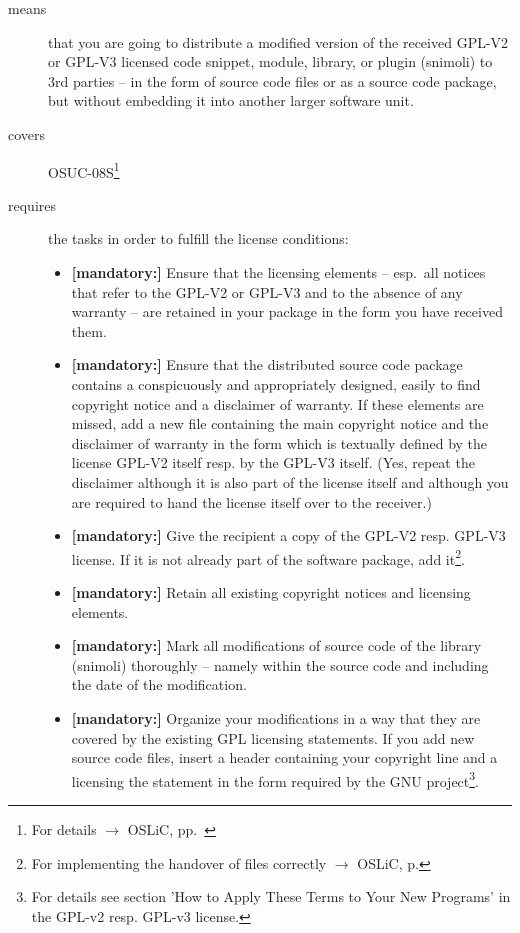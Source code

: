 \begin{description}
\item[means] that you are going to distribute a modified version of the received
GPL-V2 or GPL-V3 licensed code snippet, module, library, or plugin (snimoli) to
3rd parties -- in the form of source code files or as a source code package, but
without embedding it into another larger software unit.
\item[covers] OSUC-08S\footnote{For details $\rightarrow$ OSLiC, pp.\
\pageref{OSUC-08S-DEF}}
\item[requires] the tasks in order to fulfill the license conditions:
\begin{itemize}
 
  \item \textbf{[mandatory:]} Ensure that the licensing elements -- esp.\ all
  notices that refer to the GPL-V2 or GPL-V3 and to the absence of any
  warranty -- are retained in your package in the form you have received them.

  \item \textbf{[mandatory:]} Ensure that the distributed source code package
  contains a conspicuously and appropriately designed, easily to find copyright
  notice and a disclaimer of warranty. If these elements are missed, add a new
  file containing the main copyright notice and the disclaimer of warranty in the
  form which is textually defined by the license GPL-V2 itself resp. by the
  GPL-V3 itself. (Yes, repeat the disclaimer although it is also part of the
  license itself and although you are required to hand the license itself over
  to the receiver.)
  
  \item \textbf{[mandatory:]} Give the recipient a copy of the GPL-V2 resp.
  GPL-V3 license. If it is not already part of the software package, add
  it\footnote{For implementing the handover of files correctly $\rightarrow$
  OSLiC, p. \pageref{DistributingFilesHint}}.
  
  \item \textbf{[mandatory:]} Retain all existing copyright notices and
  licensing elements.
  
  \item \textbf{[mandatory:]} Mark all modifications of source code of the
  library (snimoli) thoroughly -- namely within the source code and including
  the date of the modification.
  
  \item \textbf{[mandatory:]} Organize your modifications in a way that they are
  covered by the existing GPL licensing statements. If you add new source code
  files, insert a header containing your copyright line and a licensing the
  statement in the form required by the GNU project\footnote{For details see
  section 'How to Apply These Terms to Your New Programs' in the GPL-v2 resp.
  GPL-v3 license.}.
    

\end{itemize}
\end{description}
